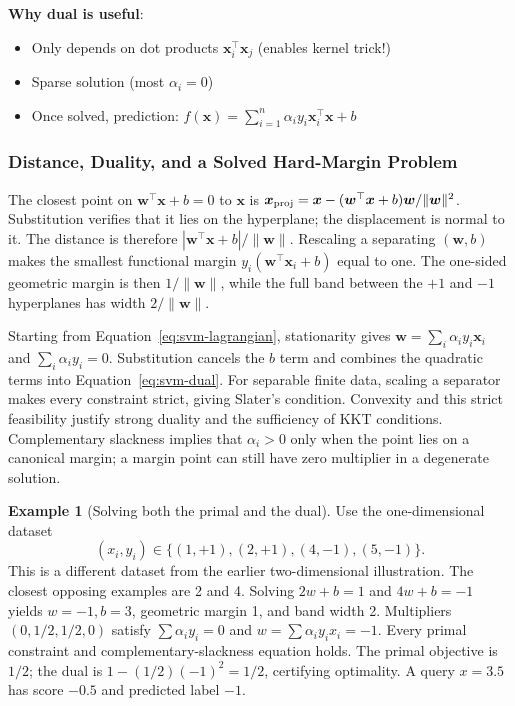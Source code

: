 \documentclass[11pt,twoside]{article}
\numberwithin{equation}{section}
\newcommand{\vect}[1]{\bm{#1}}
\theoremstyle{plain}
\theoremstyle{definition}
\newtheorem{example}[theorem]{Example}
\theoremstyle{remark}
\begin{document}
\textbf{Why dual is useful}:
\begin{itemize}
\item Only depends on dot products $\vect{x}_i^\top\vect{x}_j$ (enables kernel trick!)
\item Sparse solution (most $\alpha_i = 0$)
\item Once solved, prediction: $f(\vect{x}) = \sum_{i=1}^n \alpha_i y_i \vect{x}_i^\top\vect{x} + b$
\end{itemize}

\subsubsection{Distance, Duality, and a Solved Hard-Margin Problem}
The closest point on $\vect w^\top\vect x+b=0$ to $\vect x$ is
$\vect x_{\rm proj}=\vect x-(\vect w^\top\vect x+b)\vect w/\|\vect w\|^2$.
Substitution verifies that it lies on the hyperplane; the displacement is normal to it. The distance is therefore $|\vect w^\top\vect x+b|/\|\vect w\|$. Rescaling a separating $(\vect w,b)$ makes the smallest functional margin $y_i(\vect w^\top\vect x_i+b)$ equal to one. The one-sided geometric margin is then $1/\|\vect w\|$, while the full band between the $+1$ and $-1$ hyperplanes has width $2/\|\vect w\|$.

Starting from Equation~\eqref{eq:svm-lagrangian}, stationarity gives
$\vect w=\sum_i\alpha_i y_i\vect x_i$ and $\sum_i\alpha_i y_i=0$.
Substitution cancels the $b$ term and combines the quadratic terms into
Equation~\eqref{eq:svm-dual}.
For separable finite data, scaling a separator makes every constraint strict, giving Slater's condition. Convexity and this strict feasibility justify strong duality and the sufficiency of KKT conditions. Complementary slackness implies that $\alpha_i>0$ only when the point lies on a canonical margin; a margin point can still have zero multiplier in a degenerate solution.

\begin{example}[Solving both the primal and the dual]
Use the one-dimensional dataset
\[
(x_i,y_i)\in\{(1,+1),(2,+1),(4,-1),(5,-1)\}.
\]
This is a different dataset from the earlier two-dimensional illustration. The closest opposing examples are 2 and 4. Solving $2w+b=1$ and $4w+b=-1$ yields $w=-1,b=3$, geometric margin 1, and band width 2. Multipliers $(0,1/2,1/2,0)$ satisfy $\sum\alpha_i y_i=0$ and $w=\sum\alpha_i y_i x_i=-1$. Every primal constraint and complementary-slackness equation holds. The primal objective is $1/2$; the dual is $1-(1/2)(-1)^2=1/2$, certifying optimality. A query $x=3.5$ has score $-0.5$ and predicted label $-1$.
\end{example}
\end{document}
